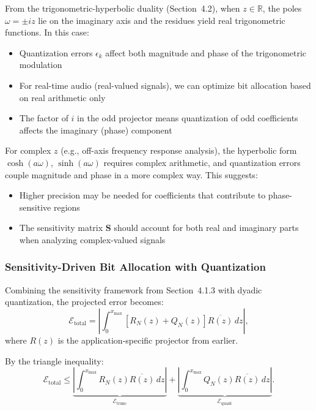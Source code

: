 \begin{remark}
From the trigonometric-hyperbolic duality (Section~4.2), when $z \in \mathbb{R}$, the poles $\omega = \pm iz$ lie on the imaginary axis and the residues yield real trigonometric functions. In this case:
\begin{itemize}
\item Quantization errors $\epsilon_k$ affect both magnitude and phase of the trigonometric modulation
\item For real-time audio (real-valued signals), we can optimize bit allocation based on real arithmetic only
\item The factor of $i$ in the odd projector means quantization of odd coefficients affects the imaginary (phase) component
\end{itemize}

For complex $z$ (e.g., off-axis frequency response analysis), the hyperbolic form $\cosh(a\omega)$, $\sinh(a\omega)$ requires complex arithmetic, and quantization errors couple magnitude and phase in a more complex way. This suggests:
\begin{itemize}
\item Higher precision may be needed for coefficients that contribute to phase-sensitive regions
\item The sensitivity matrix $\mathbf{S}$ should account for both real and imaginary parts when analyzing complex-valued signals
\end{itemize}
\end{remark}


\subsubsection{Sensitivity-Driven Bit Allocation with Quantization}

Combining the sensitivity framework from Section~4.1.3 with dyadic quantization, the projected error becomes:
\begin{equation}
\mathcal{E}_{\text{total}} = \left|\int_0^{x_{\max}} \left[R_N(z) + Q_N(z)\right] \overline{R(z)} \, dz\right|,
\label{eq:total_proj_error}
\end{equation}
where $R(z)$ is the application-specific projector from earlier.

By the triangle inequality:
\begin{equation}
\mathcal{E}_{\text{total}} \leq \underbrace{\left|\int_0^{x_{\max}} R_N(z) \overline{R(z)} \, dz\right|}_{\mathcal{E}_{\text{trunc}}} + \underbrace{\left|\int_0^{x_{\max}} Q_N(z) \overline{R(z)} \, dz\right|}_{\mathcal{E}_{\text{quant}}}.
\label{eq:error_split}
\end{equation}

